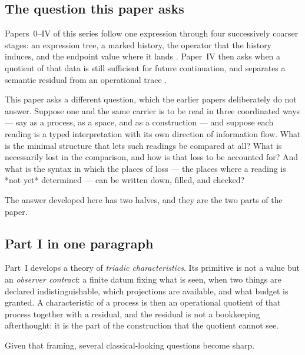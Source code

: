 \label{sec:intro-body}

\subsection{The question this paper asks}

Papers~0--IV of this series follow one expression through four successively coarser
stages: an expression tree, a marked history, the operator that the history induces,
and the endpoint value where it lands \cite{Yuan2026AEGPaperZero,Yuan2026AEGFoundations}.
Paper~IV then asks when a quotient of that data is still sufficient for future
continuation, and separates a semantic residual from an operational trace
\cite{Yuan2026AEGCondensation}.

This paper asks a different question, which the earlier papers deliberately do not
answer.  Suppose one and the same carrier is to be read in three coordinated ways ---
say as a process, as a space, and as a construction --- and suppose each reading is
a typed interpretation with its own direction of information flow.  What is the
minimal structure that lets such readings be compared at all?  What is necessarily
lost in the comparison, and how is that loss to be accounted for?  And what is the
syntax in which the places of loss --- the places where a reading is *not yet*
determined --- can be written down, filled, and checked?

The answer developed here has two halves, and they are the two parts of the paper.

\subsection{Part I in one paragraph}

Part~I develops a theory of \emph{triadic characteristics}.  Its primitive is not a
value but an \emph{observer contract}: a finite datum fixing what is seen, when two
things are declared indistinguishable, which projections are available, and what
budget is granted.  A characteristic of a process is then an operational quotient of
that process together with a residual, and the residual is not a bookkeeping
afterthought: it is the part of the construction that the quotient cannot see.

Given that framing, several classical-looking questions become sharp.

